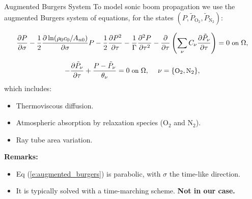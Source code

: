 \documentclass{beamer}
\newcounter{sectionframecount}
\begin{document}
\begin{frame}[t]{Augmented Burgers System}
  \vspace{-10pt}
  To model sonic boom propagation we use the augmented Burgers system of equations, for the states $(P, \tilde{P}_{\text{O}_2}, \tilde{P}_{\text{N}_2})$:

  {
  \vspace{-10pt}
  \begin{equation}
    \small
    \dfrac{\partial P}{\partial \sigma}
    -\dfrac{1}{2}\dfrac{\partial \ln(\rho_0c_0/A_{n0})}{\partial \sigma}P
    -\dfrac{1}{2}\dfrac{\partial P^2}{\partial \tau}
    -\dfrac{1}{\Gamma}\dfrac{\partial ^2 P}{\partial \tau^2}
    -\dfrac{\partial }{\partial \tau}\left(\sum_{\nu} C_\nu \dfrac{\partial\tilde{P}_\nu}{\partial \tau}\right)
    =0\text{ on }\Omega,
    \label{e:augmented_burgers}
  \end{equation}

  \vspace{-3pt}
  \begin{equation}
    \small
    -\dfrac{\partial \tilde{P}_\nu}{\partial \tau} + \dfrac{P - \tilde{P}_\nu}{\theta_\nu} = 0\text{ on }\Omega,~~~~\nu = \{\text{O}_2,\text{N}_2\},
  \end{equation}
  which includes:
  \begin{itemize}
    \item Thermoviscous diffusion.
    \item Atmospheric absorption by relaxation species (O$_2$ and N$_2$).
    \item Ray tube area variation.
  \end{itemize}
  }

  {
  \textbf{Remarks:}
  \begin{itemize}
    \item Eq (\ref{e:augmented_burgers}) is parabolic, with $\sigma$ the time-like direction.
    \item It is typically solved with a time-marching scheme. \textbf{Not in our case.}
  \end{itemize}
  }
\end{frame}

\end{document}
